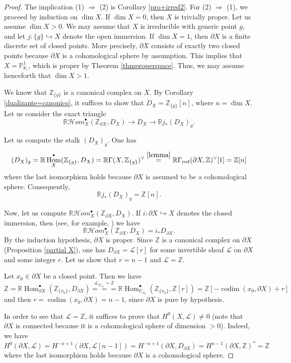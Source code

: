 \documentclass[amssymb,amscd,11pt,20pt]{amsart}
\newcommand{\codim}{{\operatorname{codim}}}
\newcommand{\FF}{{\mathtt F}}
\newcommand{\Lc}{{\mathcal L}}
\newcommand{\ZZ}{{\mathbb Z}}
\newcommand{\PP}{\mathbb P}
\newcommand{\RR}{\mathbb R}
\newcommand{\0}{\mathbf 0}
\DeclareMathOperator{\Hom}{{Hom}}
\newcommand{\pun}{{\scriptscriptstyle \bullet}}
\newcommand{\HHom}{\mathcal{H}om}
\theoremstyle{plain}
\numberwithin{equation}{thm}
\begin{document}
\begin{proof} 

The implication (1) $\Rightarrow $ (2) is Corollary \ref{pro+irred2}. For (2) $\Rightarrow $ (1), we proceed by induction on $\dim X$. If $\dim X=0$, then $X$ is trivially proper. Let us assume $\dim X >0$. We may assume that $X$ is irreducible with generic point  $g$,    and let $j\colon \{g\}\hookrightarrow X$ denote the open immersion. If $\dim X=1$, 
then $\partial X$ is a finite discrete set of closed points. More precisely, $\partial X$ consists of exactly two closed points because $\partial X$ is a cohomological sphere by assumption. This implies that $X=\PP_{\FF_1}^1$, which is proper   by Theorem \ref{thmproperspace}. Thus, we may assume henceforth that $\dim X>1$. 

We know that $\ZZ_{\{g\}}$ is a canonical complex on $X$. By Corollary \ref{dualizante=canonico}, it suffices to show that $D_X=\ZZ_{\{g\}}[n]$, where $n=\dim X$. Let us consider the exact triangle
\[ \RR\HHom_X^\pun(\ZZ_{\partial X},D_X)\to D_X\to \RR j_* (D_X)_g.\]

Let us compute the stalk $(D_X)_g$. One has
\[ (D_X)_g=\RR\Hom_X^\pun(\ZZ_{\{g\}},D_X)=\RR\Gamma(X,\ZZ_{\{g\}})^\vee \overset{\ref{lemma}}= \RR\Gamma_{\text{\rm red}}(\partial X,\ZZ)^\vee[1] = \ZZ[n]\] where the last isomorphism holds because $\partial X$ is assumed to be a cohomological sphere. Consequently, $$\RR j_*(D_X)_g=\ZZ[n].$$ 

Now, let us compute $\RR\HHom_X^\pun(\ZZ_{\partial X},D_X)$. If $i\colon\partial X\hookrightarrow X$ denotes the closed immersion, then (see, for example, \cite[Thm. 3.5]{ST2}) we have $$\RR\HHom_X^\pun(\ZZ_{\partial X},D_X)=i_* D_{\partial X}.$$ By the induction hypothesis, $\partial X$ is proper. Since $\ZZ$ is a canonical complex on $\partial X$ (Proposition \ref{partial X}), one has $D_{\partial X}=\Lc[r]$ for some invertible sheaf $\Lc$ on $\partial X$ and some integer $r$. Let us show that $r=n-1$ and $\Lc=\ZZ$.

Let $x_0\in\partial X$ be a closed point. Then we have
\[ \ZZ=\RR\Hom_{\partial X}^\pun(\ZZ_{\{x_0\}},D_{\partial X})\overset{\Lc_{\vert U_{x_0}}=\ZZ}{===} \RR\Hom_{U_{x_0}}^\pun( \ZZ_{\{x_0\}},\ZZ[r]) =   
\ZZ[-\codim(x_0,\partial X) +r]\] and then $r=\codim(x_0,\partial X)=n-1$, since $\partial X$ is pure by hypothesis.

In order to see that $\Lc=\ZZ$, it suffices to prove that $H^0(X,\Lc)\neq 0$ (note that $\partial X$ is connected because it is a cohomological sphere  of dimension $>0$). Indeed, we have
\[H^0(\partial X,\Lc)=H^{-n+1}(\partial X,\Lc[n-1])= H^{-n+1}(\partial X,D_{\partial X}) = H^{n-1}(\partial X,\ZZ)^*=\ZZ\] where the last isomorphism holds because $\partial X$ is a cohomological sphere. 


\end{proof}
\end{document}

